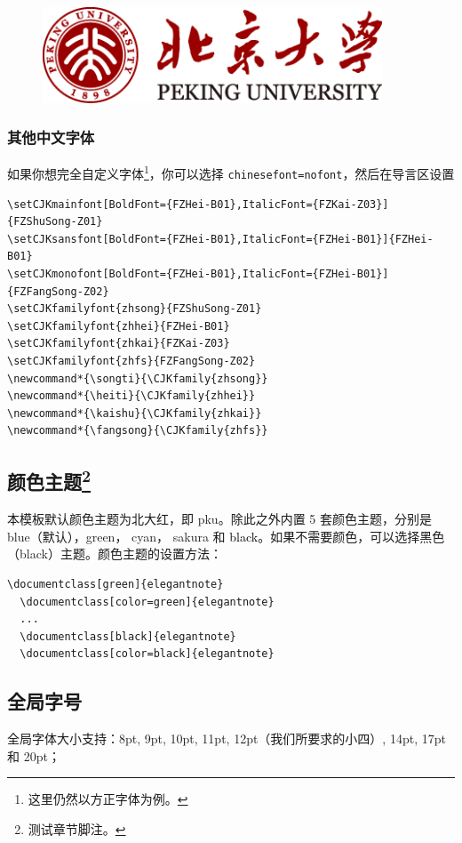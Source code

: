\documentclass[cn,hazy,pku,12pt,normal,math=newtx,cite=super]{elegantnote}
\begin{document}
\begin{figure}[!htb]
\centering
\includegraphics[width=0.9\textwidth]{images/logo_pku.png}
\end{figure}

\subsubsection{其他中文字体}
如果你想完全自定义字体\footnote{这里仍然以方正字体为例。}，你可以选择 \lstinline{chinesefont=nofont}，然后在导言区设置
\begin{lstlisting}
\setCJKmainfont[BoldFont={FZHei-B01},ItalicFont={FZKai-Z03}]{FZShuSong-Z01}
\setCJKsansfont[BoldFont={FZHei-B01},ItalicFont={FZHei-B01}]{FZHei-B01}
\setCJKmonofont[BoldFont={FZHei-B01},ItalicFont={FZHei-B01}]{FZFangSong-Z02}
\setCJKfamilyfont{zhsong}{FZShuSong-Z01}
\setCJKfamilyfont{zhhei}{FZHei-B01}
\setCJKfamilyfont{zhkai}{FZKai-Z03}
\setCJKfamilyfont{zhfs}{FZFangSong-Z02}
\newcommand*{\songti}{\CJKfamily{zhsong}}
\newcommand*{\heiti}{\CJKfamily{zhhei}}
\newcommand*{\kaishu}{\CJKfamily{zhkai}}
\newcommand*{\fangsong}{\CJKfamily{zhfs}}
\end{lstlisting}


\subsection[颜色主题]{颜色主题\footnote{测试章节脚注。}}

本模板默认颜色主题为北大红，即 \textcolor{pku}{pku}。除此之外内置 5 套颜色主题，分别是 \textcolor{eblue}{blue}（默认），\textcolor{egreen}{green}， \textcolor{ecyan}{cyan}， \textcolor{sakura}{sakura} 和 \textcolor{black}{black}。如果不需要颜色，可以选择黑色（black）主题。颜色主题的设置方法：
\begin{lstlisting}[frame=none]  
  \documentclass[green]{elegantnote}
  \documentclass[color=green]{elegantnote}
  ...
  \documentclass[black]{elegantnote}
  \documentclass[color=black]{elegantnote}
\end{lstlisting}

\subsection{全局字号}
全局字体大小支持：8pt, 9pt, 10pt, 11pt, 12pt（我们所要求的小四）, 14pt, 17pt 和 20pt；
\end{document}
